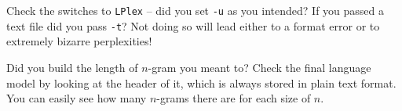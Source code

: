 Check the switches to {\tt LPlex} -- did you set {\tt -u} as you
intended?  If you passed a text file did you pass {\tt -t}?  Not doing
so will lead either to a format error or to extremely bizarre
perplexities!

Did you build the length of $n$-gram you meant to?  Check the final
language model by looking at the header of it, which is always stored
in plain text format.  You can easily see how many $n$-grams there are
for each size of $n$.
